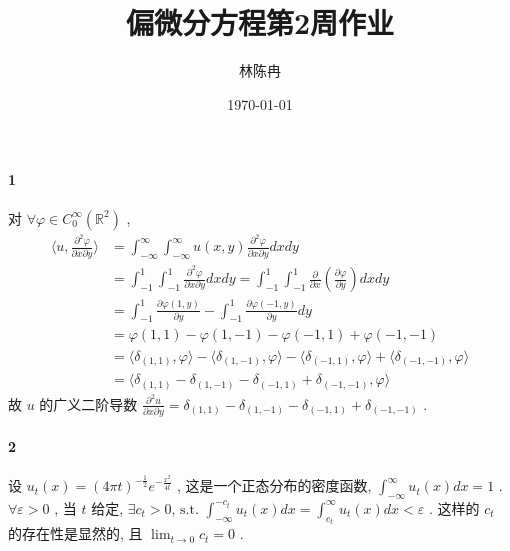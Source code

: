 \documentclass[a4paper, UTF8]{ctexart}				%
\title{偏微分方程第2周作业}
\author{林陈冉}
\date{\today}
\numberwithin{equation}{section}				%
\begin{document}
    \maketitle										%
    \paragraph{1}\quad
        对 $\forall \varphi \in C_0^{\infty}(\mathbb{R}^2)$ , 
        \begin{equation*}
            \begin{split}
                \langle{u},{\frac{\partial^2 \varphi}{\partial x \partial y}}\rangle
                & = \int^{\infty}_{-\infty}\int^{\infty}_{-\infty} u(x, y) \frac{\partial^2 \varphi}{\partial x \partial y} dx dy\\
                & = \int^{1}_{-1}\int^{1}_{-1} \frac{\partial^2 \varphi}{\partial x \partial y} dx dy
                  = \int^{1}_{-1}\int^{1}_{-1} \frac{\partial}{\partial x}(\frac{\partial \varphi}{\partial y}) dx dy\\
                & = \int^{1}_{-1} \frac{\partial \varphi(1, y)}{\partial y} - \int^{1}_{-1}\frac{\partial \varphi(-1, y)}{\partial y} dy\\
                & = \varphi(1, 1) - \varphi(1, -1) - \varphi(-1, 1) + \varphi(-1, -1)\\
                & = \langle{\delta_{(1, 1)}},{\varphi}\rangle - \langle{\delta_{(1, -1)}},{\varphi}\rangle - \langle{\delta_{(-1, 1)}},{\varphi}\rangle + \langle{\delta_{(-1, -1)}},{\varphi}\rangle\\
                & = \langle{\delta_{(1, 1)} - \delta_{(1, -1)} - \delta_{(-1, 1)} + \delta_{(-1, -1)}},{\varphi}\rangle
            \end{split}
        \end{equation*}
        故 $u$ 的广义二阶导数 $\frac{\partial^2 u}{\partial x \partial y} = \delta_{(1, 1)} - \delta_{(1, -1)} - \delta_{(-1, 1)} + \delta_{(-1, -1)}$ .
    \paragraph{2}\quad 
        设 $u_t(x) = (4 \pi t)^{-\frac{1}{2}} e^{-\frac{x^2}{4t}}$ , 这是一个正态分布的密度函数, $\int^{\infty}_{-\infty}u_t(x) dx = 1$ . $\forall \varepsilon > 0$ , 当 $t$ 给定, $\exists c_t > 0$, $\text{s.t. } \int^{-c_t}_{-\infty} u_t(x) dx = \int^{\infty}_{c_t} u_t(x) dx < \varepsilon$ .
        这样的 $c_t$ 的存在性是显然的, 且 $\lim_{t \rightarrow 0} c_t = 0$ .
        
\end{document}
